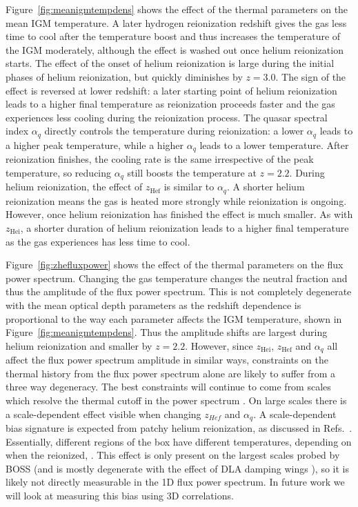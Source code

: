 \documentclass[a4paper,11pt]{article}
\begin{document}
Figure~\ref{fig:meanigmtempdens} shows the effect of the thermal parameters on the mean IGM temperature. A later hydrogen reionization redshift gives the gas less time to cool after the temperature boost and thus increases the temperature of the IGM moderately, although the effect is washed out once helium reionization starts. The effect of the onset of helium reionization is large during the initial phases of helium reionization, but quickly diminishes by $z=3.0$. The sign of the effect is reversed at lower redshift: a later starting point of helium reionization leads to a higher final temperature as reionization proceeds faster and the gas experiences less cooling during the reionization process. The quasar spectral index $\alpha_q$ directly controls the temperature during reionization: a lower $\alpha_q$ leads to a higher peak temperature, while a higher $\alpha_q$ leads to a lower temperature. After reionization finishes, the cooling rate is the same irrespective of the peak temperature, so reducing $\alpha_q$ still boosts the temperature at $z=2.2$. During helium reionization, the effect of  $z_\mathrm{Hef}$ is similar to $\alpha_q$. A shorter helium reionization means the gas is heated more strongly while reionization is ongoing. However, once helium reionization has finished the effect is much smaller. As with $z_\mathrm{Hei}$, a shorter duration of helium reionization leads to a higher final temperature as the gas experiences has less time to cool.

Figure~\ref{fig:zhefluxpower} shows the effect of the thermal parameters on the flux power spectrum. Changing the gas temperature changes the neutral fraction and thus the amplitude of the flux power spectrum. This is not completely degenerate with the mean optical depth parameters as the redshift dependence is proportional to the way each parameter affects the IGM temperature, shown in Figure~\ref{fig:meanigmtempdens}. Thus the amplitude shifts are largest during helium reionization and smaller by $z=2.2$. However, since $z_\mathrm{Hei}$, $z_\mathrm{Hef}$ and $\alpha_q$ all affect the flux power spectrum amplitude in similar ways, constraints on the thermal history from the flux power spectrum alone are likely to suffer from a three way degeneracy. The best constraints will continue to come from scales which resolve the thermal cutoff in the power spectrum \cite{Gaikwad:2021}. On large scales there is a scale-dependent effect visible when changing $z_{Hef}$ and $\alpha_q$. A scale-dependent bias signature is expected from patchy helium reionization, as discussed in Refs.~\cite{Pontzen:2014a, Pontzen:2014b,  Gontcho:2014}. Essentially, different regions of the box have different temperatures, depending on when the reionized, . This effect is only present on the largest scales probed by BOSS (and is mostly degenerate with the effect of DLA damping wings \cite{Rogers:2017}), so it is likely not directly measurable in the 1D flux power spectrum. In future work we will look at measuring this bias using 3D correlations.
\end{document}
